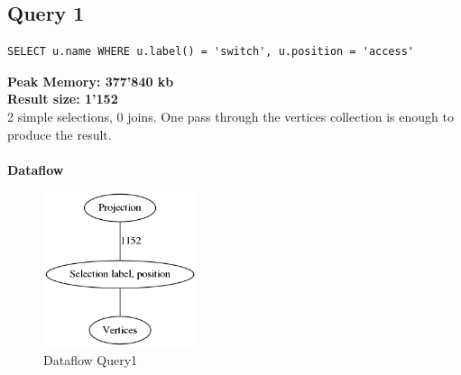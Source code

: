 \documentclass[11pt,singlecolumn]{scrartcl}
\begin{document}
\subsection{Query 1}
\begin{verbatim}
SELECT u.name WHERE u.label() = 'switch', u.position = 'access'
\end{verbatim}

\textbf{Peak Memory: 377'840 kb}\\
\textbf{Result size: 1'152} \\
2 simple selections, 0 joins. One pass through the vertices collection is enough to produce the result.\\\\
\textbf{Dataflow}
\begin{figure}[H]
\includegraphics[width=0.4\textwidth]{graph1}
\caption{Dataflow Query1}
\end{figure}
\clearpage
\end{document}
